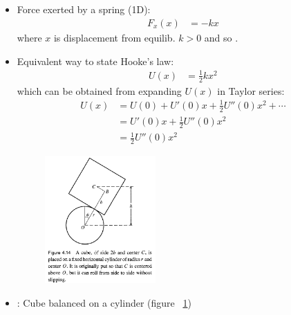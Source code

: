 \documentclass[10pt, twocolumn]{article}
\begin{document}
\subsection{}
\begin{itemize}
	\item Force exerted by a spring (1D):
	\begin{align}
		F_x(x) &= -kx
	\end{align}
	where $x$ is displacement from equilib. $k > 0$ and so . 
	\item Equivalent way to state Hooke's law:
	\begin{align}
		U(x) &= \frac{1}{2} k x^2
	\end{align}
	which can be obtained from expanding $U(x)$ in Taylor series:
	\begin{align}
		U(x) &= U(0) + U'(0) x + \frac{1}{2} U''(0) x^2 + \cdots \\
		&= U'(0) x + \frac{1}{2} U''(0) x^2  \\
		&= \frac{1}{2} U''(0) x^2  
	\end{align}
	
	\begin{figure}[b!]
		\centering
		\includegraphics[width=0.4\textwidth]{CubeOnCylinder.PNG}
		\caption{}
		\label{CubeOnCylinder}
	\end{figure} \newpage
	
	\item {}: Cube balanced on a cylinder (figure ~\ref{CubeOnCylinder})


\end{itemize}
\end{document}
